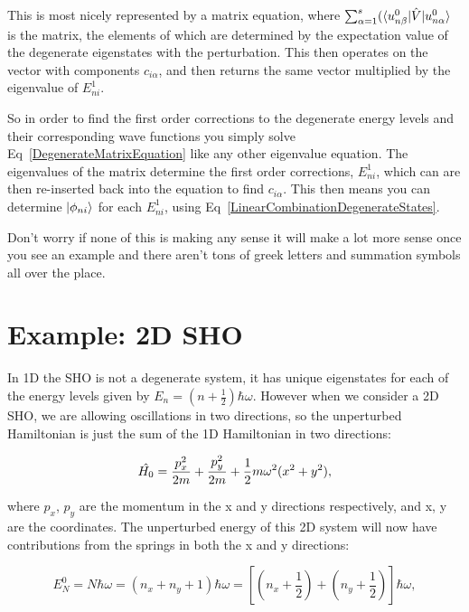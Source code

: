 \noindent This is most nicely represented by a matrix equation, where $\sum^s_{\alpha = 1} (\braket{u^0_{n\beta} | \Hat{V} | u^0_{n\alpha}}$ is the matrix, the elements of which are determined by the expectation value of the degenerate eigenstates with the perturbation. This then operates on the vector with components $c_{i \alpha}$, and then returns the same vector multiplied by the eigenvalue of $E^1_{ni}$.

\noindent So in order to find the first order corrections to the degenerate energy levels and their corresponding wave functions you simply solve Eq~\ref{DegenerateMatrixEquation} like any other eigenvalue equation. The eigenvalues of the matrix determine the first order corrections, $E^1_{ni}$, which can are then re-inserted back into the equation to find $c_{i \alpha}$. This then means you can determine $\ket{\phi_{ni}}$ for each $E^1_{ni}$, using Eq~\ref{LinearCombinationDegenerateStates}.

\noindent Don't worry if none of this is making any sense it will make a lot more sense once you see an example and there aren't tons of greek letters and summation symbols all over the place.


\section{Example: 2D SHO}

In 1D the SHO is not a degenerate system, it has unique eigenstates for each of the energy levels given by $E_n = (n + \frac{1}{2})\hbar \omega$. However when we consider a 2D SHO, we are allowing oscillations in two directions, so the unperturbed Hamiltonian is just the sum of the 1D Hamiltonian in two directions:

\begin{equation}
    \Hat{H_0} = \frac{p^2_x}{2m} + \frac{p^2_y}{2m} + \frac{1}{2} m \omega^2 (x^2 + y^2),
    \label{UnperturbedHamiltonianSHO}
\end{equation}

\noindent where $p_x$, $p_y$ are the momentum in the x and y directions respectively, and x, y are the coordinates. The unperturbed energy of this 2D system will now have contributions from the springs in both the x and y directions:

\begin{equation}
    E^0_N = N \hbar \omega = (n_x + n_y + 1) \hbar \omega = [(n_x + \frac{1}{2}) + (n_y + \frac{1}{2})] \hbar \omega,
    \label{UnperturbedEnergy2DSHO}
\end{equation}

